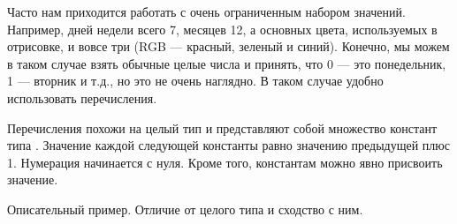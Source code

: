 \documentclass[book.tex]{subfiles}
\begin{document}
Часто нам приходится работать с очень ограниченным набором значений. Например, дней недели всего 7, месяцев 12, а основных цвета, используемых в отрисовке, и вовсе три (RGB --- красный, зеленый и синий). Конечно, мы можем в таком случае взять обычные целые числа и принять, что 0 --- это понедельник, 1 --- вторник и т.д., но это не очень наглядно. В таком случае удобно использовать перечисления.

Перечисления похожи на целый тип и представляют собой множество констант типа . Значение каждой следующей константы равно значению предыдущей плюс 1. Нумерация начинается с нуля. Кроме того, константам можно явно присвоить значение.


Описательный пример. Отличие от целого типа и сходство с ним.
\end{document}
